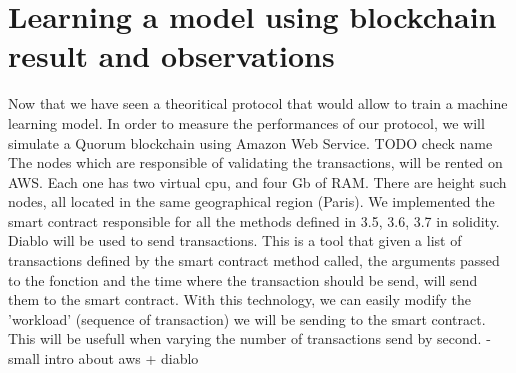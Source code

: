 \documentclass{article}
\begin{document}
\section{Learning a model using blockchain result and observations}
Now that we have seen a theoritical protocol that would allow to train a machine learning model.
In order to measure the performances of our protocol, we will simulate a Quorum blockchain using Amazon Web Service. TODO check name
The nodes which are responsible of validating the transactions, will be rented on AWS. Each one has two virtual cpu, and
four Gb of RAM. There are height such nodes, all located in the same geographical region (Paris). We implemented the
smart contract responsible for all the methods defined in {3.5, 3.6, 3.7} in solidity. Diablo will be used to send
transactions. This is a tool that given a list of transactions defined by the smart contract method
called, the arguments passed to the fonction and the time where the transaction should be send, will send them to the
smart contract. With this technology, we can easily modify the 'workload' (sequence of transaction) we will be sending
to the smart contract. This will be usefull when varying the number of transactions send by second.
- small intro about aws + diablo
\end{document}
